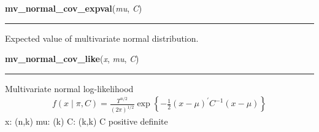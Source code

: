     \label{pymc:distributions:mv_normal_cov_expval}

    \vspace{0.5ex}

    \begin{boxedminipage}{\textwidth}

    \raggedright \textbf{mv\_normal\_cov\_expval}(\textit{mu}, \textit{C})

    \vspace{-1.5ex}

    \rule{\textwidth}{0.5\fboxrule}

Expected value of multivariate normal distribution.
    \vspace{1ex}

    \end{boxedminipage}

    \label{pymc:distributions:mv_normal_cov_like}

    \vspace{0.5ex}

    \begin{boxedminipage}{\textwidth}

    \raggedright \textbf{mv\_normal\_cov\_like}(\textit{x}, \textit{mu}, \textit{C})

    \vspace{-1.5ex}

    \rule{\textwidth}{0.5\fboxrule}

Multivariate normal log-likelihood
\begin{equation*}\begin{split}f(x \mid \pi, C) = \frac{T^{n/2}}{(2\pi)^{1/2}} \exp\left\{ -\frac{1}{2} (x-\mu)^{\prime}C^{-1}(x-\mu) \right\}\end{split}\end{equation*}
x: (n,k)
mu: (k)
C: (k,k)
C positive definite
    \vspace{1ex}

    \end{boxedminipage}

    \label{pymc:distributions:rmv_normal_chol}

    \vspace{0.5ex}

